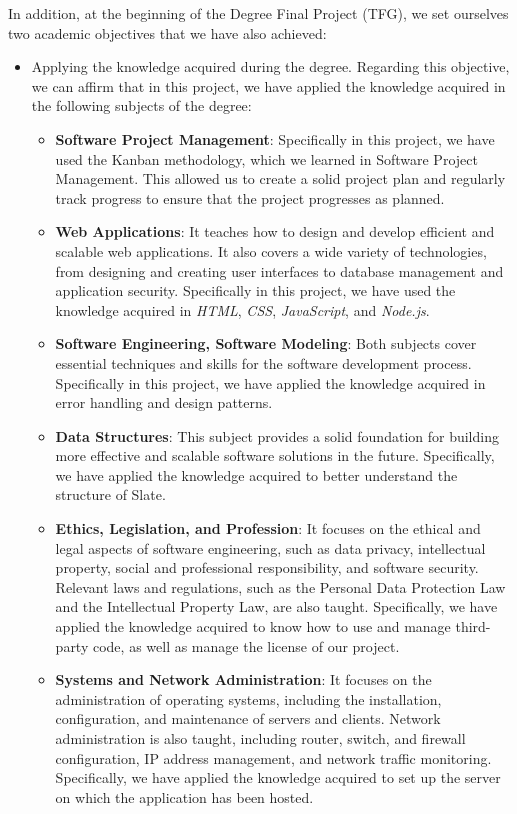 In addition, at the beginning of the Degree Final Project (TFG), we set ourselves two academic objectives that we have also achieved:
\begin{itemize}
    \item Applying the knowledge acquired during the degree. Regarding this objective, we can affirm that in this project, we have applied the knowledge acquired in the following subjects of the degree:
    \begin{itemize}
        \item \textbf{Software Project Management}: Specifically in this project, we have used the Kanban methodology, which we learned in Software Project Management. This allowed us to create a solid project plan and regularly track progress to ensure that the project progresses as planned.
        \item \textbf{Web Applications}: It teaches how to design and develop efficient and scalable web applications. It also covers a wide variety of technologies, from designing and creating user interfaces to database management and application security. Specifically in this project, we have used the knowledge acquired in \textit{HTML}, \textit{CSS}, \textit{JavaScript}, and \textit{Node.js}.
        \item \textbf{Software Engineering, Software Modeling}: Both subjects cover essential techniques and skills for the software development process. Specifically in this project, we have applied the knowledge acquired in error handling and design patterns.
        \item \textbf{Data Structures}: This subject provides a solid foundation for building more effective and scalable software solutions in the future. Specifically, we have applied the knowledge acquired to better understand the structure of Slate.
        \item \textbf{Ethics, Legislation, and Profession}: It focuses on the ethical and legal aspects of software engineering, such as data privacy, intellectual property, social and professional responsibility, and software security. Relevant laws and regulations, such as the Personal Data Protection Law and the Intellectual Property Law, are also taught. Specifically, we have applied the knowledge acquired to know how to use and manage third-party code, as well as manage the license of our project.
        \item \textbf{Systems and Network Administration}: It focuses on the administration of operating systems, including the installation, configuration, and maintenance of servers and clients. Network administration is also taught, including router, switch, and firewall configuration, IP address management, and network traffic monitoring. Specifically, we have applied the knowledge acquired to set up the server on which the application has been hosted.
    \end{itemize}
        

\end{itemize}
